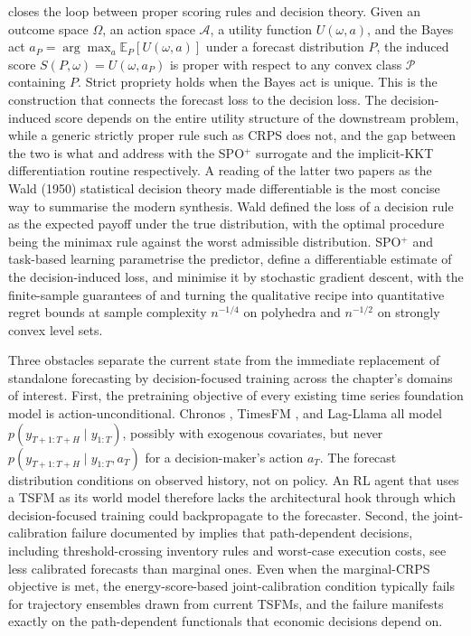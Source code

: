 \citet{Dawid1998} closes the loop between proper scoring rules and decision
theory. Given an outcome space $\Omega$, an action space $\mathcal A$, a utility
function $U(\omega, a)$, and the Bayes act $a_P = \arg\max_a \mathbb E_P[
U(\omega, a)]$ under a forecast distribution $P$, the induced score
$S(P, \omega) = U(\omega, a_P)$ is proper with respect to any convex class
$\mathcal P$ containing $P$. Strict propriety holds when the Bayes act is
unique. This is the construction that connects the forecast loss to the
decision loss. The decision-induced score depends on the entire utility
structure of the downstream problem, while a generic strictly proper rule such
as CRPS does not, and the gap between the two is what
\citet{ElmachtoubGrigas2022} and \citet{DontiAmosKolter2017} address with the
SPO$^+$ surrogate and the implicit-KKT differentiation routine respectively.
A reading of the latter two papers as the Wald (1950) statistical decision
theory made differentiable is the most concise way to summarise the modern
synthesis. Wald defined the loss of a decision rule as the expected payoff
under the true distribution, with the optimal procedure being the minimax rule
against the worst admissible distribution. SPO$^+$ and task-based learning
parametrise the predictor, define a differentiable estimate of the
decision-induced loss, and minimise it by stochastic gradient descent, with the
finite-sample guarantees of \citet{LiuGrigas2021} and \citet{HuangGupta2024}
turning the qualitative recipe into quantitative regret bounds at sample
complexity $n^{-1/4}$ on polyhedra and $n^{-1/2}$ on strongly convex level
sets.

Three obstacles separate the current state from the immediate replacement of
standalone forecasting by decision-focused training across the chapter's
domains of interest. First, the pretraining objective of every existing time
series foundation model is action-unconditional. Chronos
\citep{Ansari2024}, TimesFM \citep{Das2024}, and Lag-Llama \citep{Rasul2023}
all model $p(y_{T+1:T+H} \mid y_{1:T})$, possibly with exogenous covariates, but
never $p(y_{T+1:T+H} \mid y_{1:T}, a_T)$ for a decision-maker's action $a_T$.
The forecast distribution conditions on observed history, not on policy. An
RL agent that uses a TSFM as its world model therefore lacks the architectural
hook through which decision-focused training could backpropagate to the
forecaster. Second, the joint-calibration failure documented by
\citet{PerezDiaz2025} implies that path-dependent decisions, including
threshold-crossing inventory rules and worst-case execution costs, see less
calibrated forecasts than marginal ones. Even when the marginal-CRPS objective
is met, the energy-score-based joint-calibration condition typically fails for
trajectory ensembles drawn from current TSFMs, and the failure manifests
exactly on the path-dependent functionals that economic decisions depend on.

